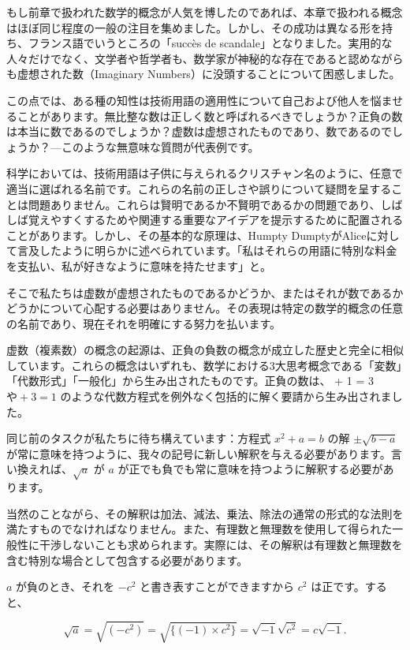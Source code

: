 \documentclass[a4paper,11pt,openany]{ltjsbook}
\begin{document}
もし前章で扱われた数学的概念が人気を博したのであれば、本章で扱われる概念はほぼ同じ程度の一般の注目を集めました。しかし、その成功は異なる形を持ち、フランス語でいうところの「succès de scandale」となりました。実用的な人々だけでなく、文学者や哲学者も、数学家が神秘的な存在であると認めながらも虚想された数（Imaginary Numbers）に没頭することについて困惑しました。

この点では、ある種の知性は技術用語の適用性について自己および他人を悩ませることがあります。無比整な数は正しく数と呼ばれるべきでしょうか？正負の数は本当に数であるのでしょうか？虚数は虚想されたものであり、数であるのでしょうか？---このような無意味な質問が代表例です。

科学においては、技術用語は子供に与えられるクリスチャン名のように、任意で適当に選ばれる名前です。これらの名前の正しさや誤りについて疑問を呈することは問題ありません。これらは賢明であるか不賢明であるかの問題であり、しばしば覚えやすくするためや関連する重要なアイデアを提示するために配置されることがあります。しかし、その基本的な原理は、Humpty DumptyがAliceに対して言及したように明らかに述べられています。「私はそれらの用語に特別な料金を支払い、私が好きなように意味を持たせます」と。

そこで私たちは虚数が虚想されたものであるかどうか、またはそれが数であるかどうかについて心配する必要はありません。その表現は特定の数学的概念の任意の名前であり、現在それを明確にする努力を払います。

虚数（複素数）の概念の起源は、正負の負数の概念が成立した歴史と完全に相似しています。これらの概念はいずれも、数学における3大思考概念である「変数」「代数形式」「一般化」から生み出されたものです。正負の数は、 + 1 = 3$ や  + 3 = 1$ のような代数方程式を例外なく包括的に解く要請から生み出されました。

同じ前のタスクが私たちに待ち構えています：方程式 \(x^2 + a = b\) の解 \(\pm\sqrt{b - a}\) が常に意味を持つように、我々の記号に新しい解釈を与える必要があります。言い換えれば、\(\sqrt{a}\) が \(a\) が正でも負でも常に意味を持つように解釈する必要があります。

当然のことながら、その解釈は加法、減法、乗法、除法の通常の形式的な法則を満たすものでなければなりません。また、有理数と無理数を使用して得られた一般性に干渉しないことも求められます。実際には、その解釈は有理数と無理数を含む特別な場合として包含する必要があります。

\(a\) が負のとき、それを \(-c^2\) と書き表すことができますから \(c^2\) は正です。すると、

\[
\sqrt{a} = \sqrt{(-c^2)} = \sqrt{\{(-1) \times c^2\}} = \sqrt{-1} \sqrt{c^2} = c\sqrt{-1}.
\]
\end{document}
